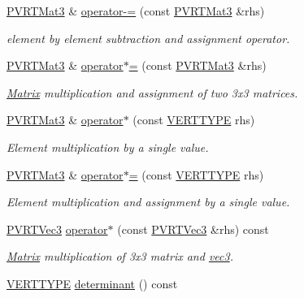 \begin{DoxyCompactItemize}
\hyperlink{struct_p_v_r_t_mat3}{P\+V\+R\+T\+Mat3} \& \hyperlink{struct_p_v_r_t_mat3_a7912c1497d5cf0a87591f1a335f6ce90}{operator-\/=} (const \hyperlink{struct_p_v_r_t_mat3}{P\+V\+R\+T\+Mat3} \&rhs)
\begin{DoxyCompactList}\small\item\em element by element subtraction and assignment operator. \end{DoxyCompactList}\item 
\hyperlink{struct_p_v_r_t_mat3}{P\+V\+R\+T\+Mat3} \& \hyperlink{struct_p_v_r_t_mat3_a62ab97cc6ce06860cb740c8eebcf99e1}{operator$\ast$=} (const \hyperlink{struct_p_v_r_t_mat3}{P\+V\+R\+T\+Mat3} \&rhs)
\begin{DoxyCompactList}\small\item\em \hyperlink{class_matrix}{Matrix} multiplication and assignment of two 3x3 matrices. \end{DoxyCompactList}\item 
\hyperlink{struct_p_v_r_t_mat3}{P\+V\+R\+T\+Mat3} \& \hyperlink{struct_p_v_r_t_mat3_a6208d7dcd96038cb04504d1ea995a3f9}{operator$\ast$} (const \hyperlink{group___a_p_i___o_g_l_e_s_ga06da457b7d3e93368ab904f89e1396be}{V\+E\+R\+T\+T\+Y\+P\+E} rhs)
\begin{DoxyCompactList}\small\item\em Element multiplication by a single value. \end{DoxyCompactList}\item 
\hyperlink{struct_p_v_r_t_mat3}{P\+V\+R\+T\+Mat3} \& \hyperlink{struct_p_v_r_t_mat3_a4156b549d88c7fead09d5c92dc865ee1}{operator$\ast$=} (const \hyperlink{group___a_p_i___o_g_l_e_s_ga06da457b7d3e93368ab904f89e1396be}{V\+E\+R\+T\+T\+Y\+P\+E} rhs)
\begin{DoxyCompactList}\small\item\em Element multiplication and assignment by a single value. \end{DoxyCompactList}\item 
\hyperlink{struct_p_v_r_t_vec3}{P\+V\+R\+T\+Vec3} \hyperlink{struct_p_v_r_t_mat3_a0baff987c43d2ceb9a5f81169936dc6f}{operator$\ast$} (const \hyperlink{struct_p_v_r_t_vec3}{P\+V\+R\+T\+Vec3} \&rhs) const 
\begin{DoxyCompactList}\small\item\em \hyperlink{class_matrix}{Matrix} multiplication of 3x3 matrix and \hyperlink{classvec3}{vec3}. \end{DoxyCompactList}\item 
\hyperlink{group___a_p_i___o_g_l_e_s_ga06da457b7d3e93368ab904f89e1396be}{V\+E\+R\+T\+T\+Y\+P\+E} \hyperlink{struct_p_v_r_t_mat3_a8dfbe8f76425e28e4b3dc2dcadcc4ef0}{determinant} () const 

\end{DoxyCompactItemize}
